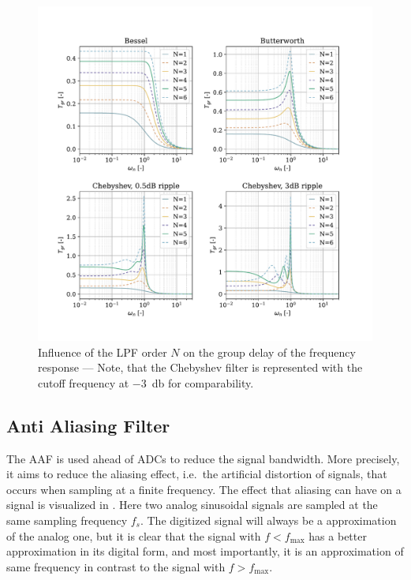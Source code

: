 \begin{figure}[!htb]
  \centering
  \includegraphics[scale=0.72]{figures/electronics/lowpass/lp_filter_grd}
  \caption[Influence of the \ac{LPF} order $N$ on the group delay of the frequency response]{Influence of the \ac{LPF} order $N$ on the group delay of the frequency response --- Note, that the Chebyshev filter is represented with the cutoff frequency at \SI{-3}{\decibel} for comparability.%
  \label{fig:lp_filter_grd}}
\end{figure}


\subsection{Anti Aliasing Filter}
The \acf{AAF} is used ahead of \ac{ADC}s to reduce the signal bandwidth. More precisely, it aims to reduce the aliasing effect, i.e.\ the artificial distortion of signals, that occurs when sampling at a finite frequency. The effect that aliasing can have on a signal is visualized in . Here two analog sinusoidal signals are sampled at the same sampling frequency $f_s$. The digitized signal will always be a approximation of the analog one, but it is clear that the signal with $f<f_{\max}$ has a better approximation in its digital form, and most importantly, it is an approximation of same frequency in contrast to the signal with $f>f_{\max}$.

